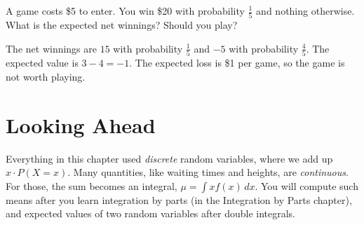 \begin{Exercise}[label=rv4, title=Is the game worth playing?]
A game costs \$5 to enter. You win \$20 with probability $\frac{1}{5}$ and nothing
otherwise. What is the expected net winnings? Should you play?
\end{Exercise}
\begin{Answer}[ref=rv4]
The net winnings are $15$ with probability $\frac{1}{5}$ and $-5$ with probability
$\frac{4}{5}$. The expected value is $3 - 4 = -1$. The expected loss is \$1 per
game, so the game is not worth playing.
\end{Answer}

\section{Looking Ahead}
Everything in this chapter used \emph{discrete} random variables, where we
add up $x \cdot P(X = x)$. Many quantities, like waiting times and
heights, are \emph{continuous}. For those, the sum becomes an integral,
$\mu = \int x f(x)\,dx$. You will compute such means after you learn
integration by parts (in the Integration by Parts chapter), and expected
values of two random variables after double integrals.
